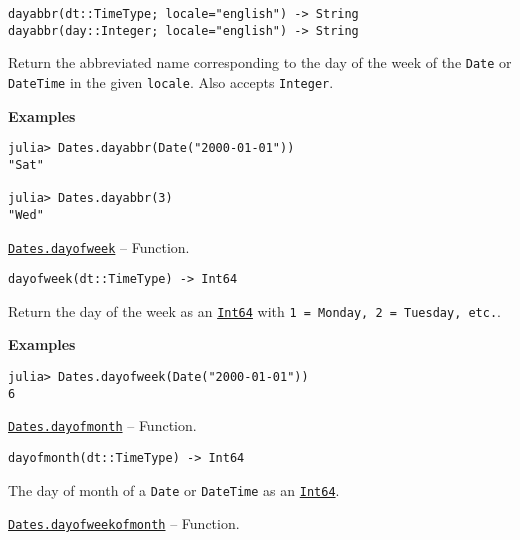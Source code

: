 \begin{adjustwidth}{2em}{0pt}


\begin{verbatim}
dayabbr(dt::TimeType; locale="english") -> String
dayabbr(day::Integer; locale="english") -> String
\end{verbatim}

Return the abbreviated name corresponding to the day of the week of the \texttt{Date} or \texttt{DateTime} in the given \texttt{locale}. Also accepts \texttt{Integer}.

\textbf{Examples}


\begin{verbatim}
julia> Dates.dayabbr(Date("2000-01-01"))
"Sat"

julia> Dates.dayabbr(3)
"Wed"
\end{verbatim}



\end{adjustwidth}
\hypertarget{12798531608759474645}{}
\hyperlink{12798531608759474645}{\texttt{Dates.dayofweek}}  -- {Function.}

\begin{adjustwidth}{2em}{0pt}


\begin{verbatim}
dayofweek(dt::TimeType) -> Int64
\end{verbatim}

Return the day of the week as an \hyperlink{7720564657383125058}{\texttt{Int64}} with \texttt{1 = Monday, 2 = Tuesday, etc.}.

\textbf{Examples}


\begin{verbatim}
julia> Dates.dayofweek(Date("2000-01-01"))
6
\end{verbatim}



\end{adjustwidth}
\hypertarget{11391658730748043877}{}
\hyperlink{11391658730748043877}{\texttt{Dates.dayofmonth}}  -- {Function.}

\begin{adjustwidth}{2em}{0pt}


\begin{verbatim}
dayofmonth(dt::TimeType) -> Int64
\end{verbatim}

The day of month of a \texttt{Date} or \texttt{DateTime} as an \hyperlink{7720564657383125058}{\texttt{Int64}}.



\end{adjustwidth}
\hypertarget{3444497056704321071}{}
\hyperlink{3444497056704321071}{\texttt{Dates.dayofweekofmonth}}  -- {Function.}

